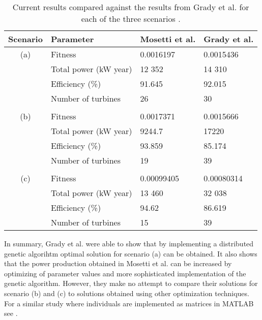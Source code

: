 \begin{table}[h!]
\begin{center}
\caption{Current results compared against the results from Grady et al. for each of the three scenarios \citep{Grady}.}
\label{Results Grady et al.}
\begin{tabular}{c|l|l|l}
Scenario & Parameter                    & Mosetti et al.  & Grady et al. \\ 
\hline 
(a)          & Fitness                        & 0.0016197     & 0.0015436 \\ 
              & Total power (kW year) & 12 352           & 14 310 \\ 
              & Efficiency (\%)            & 91.645            & 92.015 \\ 
              & Number of turbines     & 26                    & 30  \\ 
&&&\\
(b)         & Fitness                        & 0.0017371      & 0.0015666 \\ 
              & Total power (kW year) & 9244.7           & 17220 \\ 
              & Efficiency (\%)            & 93.859           & 85.174 \\ 
              & Number of turbines     & 19                   & 39 \\ 
&&&\\
(c)         & Fitness                        & 0.00099405   & 0.00080314 \\ 
              & Total power (kW year) & 13 460          & 32 038 \\ 
              & Efficiency (\%)            & 94.62            & 86.619 \\ 
              & Number of turbines     & 15                  & 39 \\  
\end{tabular} 
\end{center}
\end{table}


\noindent In summary, Grady et al. were able to show that by implementing a distributed genetic algorihtm optimal solution for scenario (a) can be obtained. It also shows that the power production obtained in Mosetti et al. can be increased by optimizing of parameter values and more sophisticated implementation of the genetic algorithm. However, they make no attempt to compare their solutions for scenario (b) and (c) to solutions obtained using other optimization techniques. For a similar study where individuals are implemented as matrices in MATLAB see \citep{Emami}.\\


